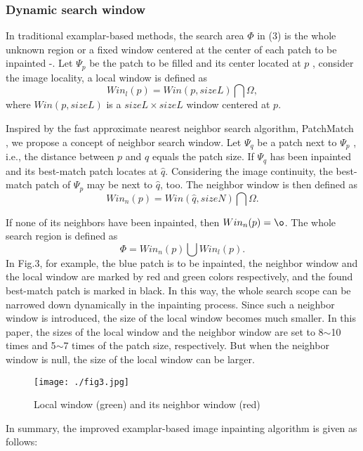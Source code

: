 \subsubsection{Dynamic search window}
\label{sec:2.2.2}
In traditional examplar-based methods, the search area \(\Phi\) in (3) is the whole unknown region or a fixed window centered at the center of each patch to be inpainted \cite{Criminisi04regionfilling}-\cite{LeMeur_2011}. Let \(\Psi_p\) be the patch to be filled and its center located at \(p\) ,  consider the image locality, a local window is defined as
$$Win_l(p)=Win(p,sizeL)\bigcap \Omega,$$
where \(Win(p,sizeL)\) is a \(sizeL\times sizeL\) window centered at \( p\). \par Inspired by the fast approximate nearest neighbor search algorithm, PatchMatch \cite{Barnes:2009}, we propose a concept of neighbor search window. Let \(\Psi_q\) be a patch next to \(\Psi_p\)  , i.e., the distance between \(p\) and \(q\) equals the patch size. If \(\Psi_q\) has been inpainted and its best-match patch locates at \(\hat{q}\). Considering the image continuity, the best-match patch of \(\Psi_p\) may be next to \(\hat{q}\), too. The neighbor window is then defined as
$$Win_n(p)=Win(\hat{q},sizeN)\bigcap\Omega.$$ \par
If none of its neighbors have been inpainted, then \( Win_n(p)=\o \). The whole search region is defined as
$$\Phi=Win_n(p)\bigcup Win_l(p).$$
In Fig.3, for example, the blue patch is to be inpainted, the neighbor window and the local window are marked by red and green colors respectively, and the found best-match patch is marked in black. In this way, the whole search scope can be narrowed down dynamically in the inpainting process. Since such a neighbor window is introduced, the size of the local window becomes much smaller. In this paper, the sizes of the local window and the neighbor window are set to 8\(\sim\)10 times and 5\(\sim\)7 times of the patch size, respectively. But when the neighbor window is null, the size of the local window can be larger.\par
\begin{figure}[!htbp]
	\begin{center}
			\texttt{[image: ./fig3.jpg]}
	\end{center}
    \caption{Local window (green) and its neighbor window (red)}
	\label{fig:3}
\end{figure}
In summary, the improved examplar-based image inpainting algorithm is given as follows:\\
